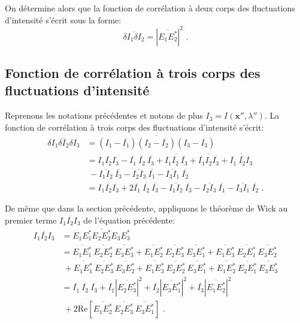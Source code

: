 On détermine alors que la fonction de corrélation à deux corps des fluctuations d'intensité s'écrit sous la forme:
\begin{equation}
\overline{\delta I_1 \delta I_2} = \left| \overline{E_1 E^*_2} \right|^2 \text{ .}
\label{eq:theoreme_wick_2corps}
\end{equation}


\subsection{Fonction de corrélation à trois corps des fluctuations d'intensité}
Reprenons les notations précédentes et notons de plus $I_3=I(\mathbf{x}'',\lambda'')$. La fonction de corrélation à trois corps des fluctuations d'intensité s'écrit:
\begin{align}
\overline{\delta I_1 \delta I_2 \delta I_3} &= \overline{(I_1 -\overline{I_1})(I_2 -\overline{I_2})(I_3-\overline{I_3})} \\
&=\overline{I_1 I_2 I_3} - \overline{I_1} \: \overline{I_2} \: \overline{I_3} + \overline{I_1 \overline{I_2}\:\overline{I_3}} + \overline{\overline{I_1} I_2 \overline{I_3}} + \overline{\overline{I_1} \: \overline{I_2} I_3} \\
&\nonumber \: - \overline{I_1 I_2} \: \overline{I_3} - \overline{ I_2 I_3} \: \overline{I_1} - \overline{I_3 I_1} \: \overline{I_2} \\
&= \overline{I_1 I_2 I_3} +2 \overline{I_1}\: \overline{I_2}\: \overline{I_3} - \overline{I_1 I_2}\:\overline{I_3} - \overline{I_2 I_3}\:\overline{I_1}- \overline{I_3 I_1}\:\overline{I_2} \text{ .}
\end{align}

De même que dans la section précédente, appliquons le théorème de Wick au premier terme $\overline{I_1 I_2 I_3}$ de l'équation précédente:
\begin{align}
\overline{I_1 I_2 I_3} &= \overline{E_1 E^*_1 E_2 E^*_2 E_3 E^*_3} \\
&= \overline{E_1 E^*_1}\:\overline{E_2 E^*_2}\:\overline{E_3 E^*_3} + \overline{E_1 E^*_2}\:\overline{E_2 E^*_3}\:\overline{E_3 E^*_1} + \overline{E_1 E^*_3}\:\overline{E_2 E^*_1}\:\overline{E_3 E^*_2}\\
\nonumber & \: + \overline{E_1 E^*_1}\:\overline{E_2 E^*_3}\:\overline{E_3 E^*_2} + \overline{E_1 E^*_3}\:\overline{E_2 E^*_2}\:\overline{E_3 E^*_1} + \overline{E_1 E^*_2}\:\overline{E_2 E^*_1}\:\overline{E_3 E^*_3}\\
&= \overline{I_1}\: \overline{I_2}\: \overline{I_3} + \overline{I_1} \left|\overline{E_2 E^*_3}\right|^2 + \overline{I_2} \left|\overline{E_3 E^*_1}\right|^2 + \overline{I_3} \left|\overline{E_1 E^*_2}\right|^2 \\
&\nonumber \: +2 \mathrm{Re}\left[ \overline{E_1 E^*_2}\:\overline{E_2 E^*_3}\:\overline{E_3 E^*_1} \right] \text{ .}
\end{align}

